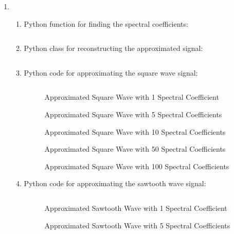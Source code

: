 \documentclass[10pt,a4paper, margin=1in]{article}
\begin{document}
\begin{enumerate}
\item \begin{enumerate}
    \item Python function for finding the spectral coefficients: \inputminted{python}{q8a.py}
    \item Python class for reconstructing the approximated signal: \inputminted{python}{q8b.py}
    \item Python code for approximating the square wave signal: \inputminted{python}{q8c.py}
    \begin{figure}[H]
        \centering
        \caption{Approximated Square Wave with 1 Spectral Coefficient}
        
    \end{figure}
    \begin{figure}[H]
        \centering
        \caption{Approximated Square Wave with 5 Spectral Coefficients}
        
    \end{figure}
    \begin{figure}[H]
        \centering
        \caption{Approximated Square Wave with 10 Spectral Coefficients}
        
    \end{figure}
    \begin{figure}[H]
        \centering
        \caption{Approximated Square Wave with 50 Spectral Coefficients}
        
    \end{figure}
    \begin{figure}[H]
        \centering
        \caption{Approximated Square Wave with 100 Spectral Coefficients}
        
    \end{figure}
    \item Python code for approximating the sawtooth wave signal: \inputminted{python}{q8d.py}
    \begin{figure}[H]
        \centering
        \caption{Approximated Sawtooth Wave with 1 Spectral Coefficient}
        
    \end{figure}
    \begin{figure}[H]
        \centering
        \caption{Approximated Sawtooth Wave with 5 Spectral Coefficients}

\end{figure}
\end{enumerate}
\end{enumerate}
\end{document}
